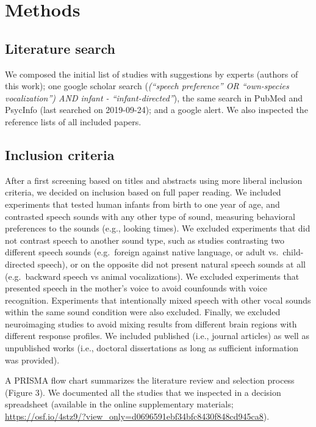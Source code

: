 \documentclass[man]{apa6}
\begin{document}
\section{Methods}\label{methods}

\subsection{Literature search}\label{literature-search}

We composed the initial list of studies with suggestions by experts
(authors of this work); one google scholar search
(\emph{(\enquote{speech preference} OR \enquote{own-species
vocalization}) AND infant - \enquote{infant-directed}}), the same search
in PubMed and PsycInfo (last searched on 2019-09-24); and a google
alert. We also inspected the reference lists of all included papers.

\subsection{Inclusion criteria}\label{inclusion-criteria}

After a first screening based on titles and abstracts using more liberal
inclusion criteria, we decided on inclusion based on full paper reading.
We included experiments that tested human infants from birth to one year
of age, and contrasted speech sounds with any other type of sound,
measuring behavioral preferences to the sounds (e.g., looking times). We
excluded experiments that did not contrast speech to another sound type,
such as studies contrasting two different speech sounds (e.g.~foreign
against native language, or adult vs.~child-directed speech), or on the
opposite did not present natural speech sounds at all (e.g.~backward
speech vs animal vocalizations). We excluded experiments that presented
speech in the mother's voice to avoid counfounds with voice recognition.
Experiments that intentionally mixed speech with other vocal sounds
within the same sound condition were also excluded. Finally, we excluded
neuroimaging studies to avoid mixing results from different brain
regions with different response profiles. We included published (i.e.,
journal articles) as well as unpublished works (i.e., doctoral
dissertations as long as sufficient information was provided).

A PRISMA flow chart summarizes the literature review and selection
process (Figure 3). We documented all the studies that we inspected in a
decision spreadsheet (available in the online supplementary materials;
\url{https://osf.io/4stz9/?view_only=d0696591ebf34bfc8430f848cd945ca8}).
\end{document}
